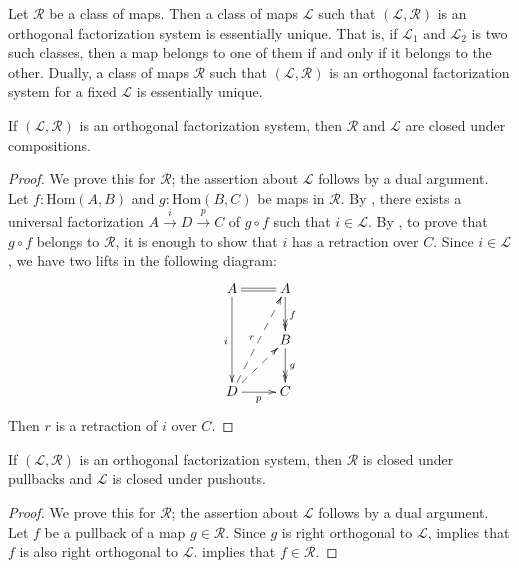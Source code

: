 \documentclass[reqno]{amsart}
\theoremstyle{definition}
\theoremstyle{remark}
\newcommand{\fs}[1]{\mathrm{#1}}
\newcommand{\Hom}{\fs{Hom}}
\numberwithin{figure}{section}
\begin{document}
\begin{cor}
Let $\mathcal{R}$ be a class of maps.
Then a class of maps $\mathcal{L}$ such that $(\mathcal{L},\mathcal{R})$ is an orthogonal factorization system is essentially unique.
That is, if $\mathcal{L}_1$ and $\mathcal{L}_2$ is two such classes, then a map belongs to one of them if and only if it belongs to the other.
Dually, a class of maps $\mathcal{R}$ such that $(\mathcal{L},\mathcal{R})$ is an orthogonal factorization system for a fixed $\mathcal{L}$ is essentially unique.
\end{cor}

\begin{prop}
If $(\mathcal{L},\mathcal{R})$ is an orthogonal factorization system, then $\mathcal{R}$ and $\mathcal{L}$ are closed under compositions.
\end{prop}
\begin{proof}
We prove this for $\mathcal{R}$; the assertion about $\mathcal{L}$ follows by a dual argument.
Let $f : \Hom(A,B)$ and $g : \Hom(B,C)$ be maps in $\mathcal{R}$.
By , there exists a universal factorization $A \xrightarrow{i} D \xrightarrow{p} C$ of $g \circ f$ such that $i \in \mathcal{L}$.
By , to prove that $g \circ f$ belongs to $\mathcal{R}$, it is enough to show that $i$ has a retraction over $C$.
Since $i \in \mathcal{L}$, we have two lifts in the following diagram:
\[ \xymatrix{ A \ar@{=}[r] \ar[dd]_i                    & A \ar@{->>}[d]^f \\
                                                        & B \ar@{->>}[d]^g \\
              D \ar[r]_p \ar@{-->}[ur] \ar@{-->}[uur]^r & C
            } \]
Then $r$ is a retraction of $i$ over $C$.
\end{proof}

\begin{prop}
If $(\mathcal{L},\mathcal{R})$ is an orthogonal factorization system, then $\mathcal{R}$ is closed under pullbacks and $\mathcal{L}$ is closed under pushouts.
\end{prop}
\begin{proof}
We prove this for $\mathcal{R}$; the assertion about $\mathcal{L}$ follows by a dual argument.
Let $f$ be a pullback of a map $g \in \mathcal{R}$.
Since $g$ is right orthogonal to $\mathcal{L}$,  implies that $f$ is also right orthogonal to $\mathcal{L}$.
 implies that $f \in \mathcal{R}$.
\end{proof}
\end{document}

